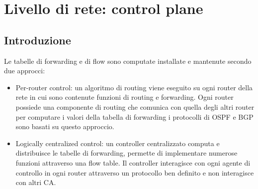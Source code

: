 \chapter{Livello di rete: control plane}
\section{Introduzione}
Le tabelle di forwarding e di flow sono computate installate e mantenute secondo due approcci:
\begin{itemize}
\item Per-router control: un algoritmo di routing viene eseguito su ogni router della rete in cui sono contenute funzioni di routing e forwarding. Ogni 
router possiede una componente di routing che comunica con quella degli altri router per computare i valori della tabella di forwarding i protocolli di 
OSPF e BGP sono basati su questo approccio.
\item Logically centralized control: un controller centralizzato computa e distribuisce le tabelle di forwarding, permette di implementare numerose funzioni
attraverso una flow table. Il controller interagisce con ogni agente di controllo in ogni router attraverso un protocollo ben definito e non interagisce con
altri CA. 
\end{itemize}
